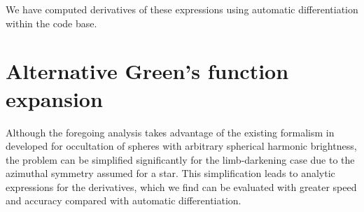 \documentclass[modern]{aastex61}
\begin{document}

We have computed derivatives of these expressions using automatic
differentiation within the \starry code base.

\section{Alternative Green's function expansion} \label{sec:power_law}

Although the foregoing analysis takes advantage of the existing formalism
in \starry developed for occultation of spheres with arbitrary spherical harmonic
brightness, the problem can be simplified significantly for the limb-darkening
case due to the azimuthal symmetry assumed for a star.  This simplification
leads to analytic expressions for the derivatives, which we find can be
evaluated with greater speed and accuracy compared with automatic differentiation.
\end{document}
